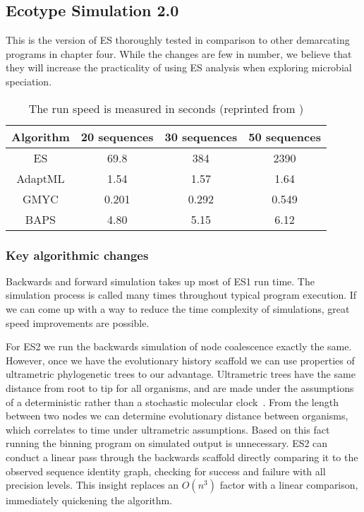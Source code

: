 \subsection*{Ecotype Simulation 2.0}
This is the version of ES thoroughly tested in comparison to other demarcating programs in chapter four.
While the changes are few in number, we believe that they will increase the practicality of using ES analysis when exploring microbial speciation.

\begin{table}
 \begin{tabular}{| c | c | c | c |}
  \hline
  Algorithm & 20 sequences & 30 sequences & 50 sequences \\ \hline
  ES & 69.8 & 384 & 2390 \\
  AdaptML & 1.54 & 1.57 & 1.64 \\
  GMYC & 0.201 & 0.292 & 0.549 \\
  BAPS & 4.80 & 5.15 & 6.12 \\
  \hline
 \end{tabular}
 \caption[ES1 run-time compared to other demarcation programs.]{The run speed is measured in seconds (reprinted from \protect\cite{carlo})}
 \label{tab:ES1speed}
\end{table}

\subsubsection*{Key algorithmic changes}
Backwards and forward simulation takes up most of ES1 run time.
The simulation process is called many times throughout typical program execution.
If we can come up with a way to reduce the time complexity of simulations, great speed improvements are possible.

For ES2 we run the backwards simulation of node coalescence exactly the same.
However, once we have the evolutionary history scaffold we can use properties of ultrametric phylogenetic trees to our advantage.
Ultrametric trees have the same distance from root to tip for all organisms, and are made under the assumptions of a deterministic rather than a stochastic molecular clock~\cite{ho2008molecular}.
From the length between two nodes we can determine evolutionary distance between organisms, which correlates to time under ultrametric assumptions.
Based on this fact running the binning program on simulated output is unnecessary.
ES2 can conduct a linear pass through the backwards scaffold directly comparing it to the observed sequence identity graph, checking for success and failure with all precision levels.
This insight replaces an $O(n^3)$ factor with a linear comparison, immediately quickening the algorithm. 

